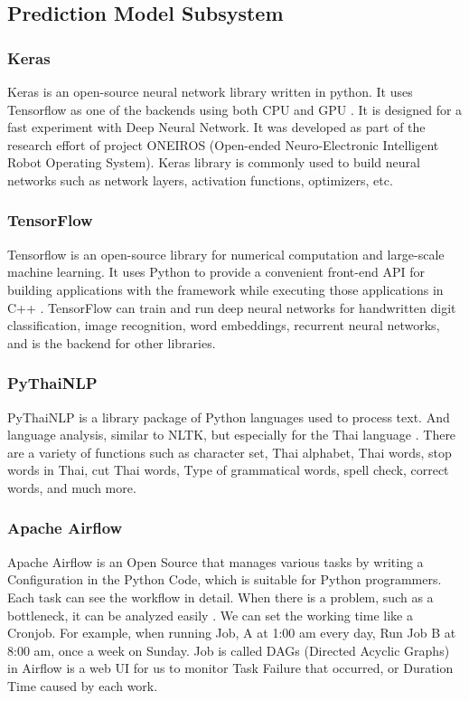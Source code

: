 \documentclass[12pt,oneside,openright,a4paper]{cpe-english-project}
\begin{document}
\subsection{Prediction Model Subsystem}
\subsubsection{Keras}
Keras is an open-source neural network library written in python. It uses Tensorflow as one of the
backends using both CPU and GPU \cite{keras}. It is designed for a fast experiment with Deep Neural
Network. It was developed as part of the research effort of project ONEIROS (Open-ended Neuro-Electronic
Intelligent Robot Operating System). Keras library is commonly used to build neural networks such as network
layers, activation functions, optimizers, etc.

\subsubsection{TensorFlow}
Tensorflow is an open-source library for numerical computation and large-scale machine learning.
It uses Python to provide a convenient front-end API for building applications with the framework
while executing those applications in C++ \cite{what_is_tf}. TensorFlow can train and run deep neural
networks for handwritten digit classification, image recognition, word embeddings, recurrent neural
networks, and is the backend for other libraries.

\subsubsection{PyThaiNLP}
PyThaiNLP is a library package of Python languages used to process text. And language analysis,
similar to NLTK, but especially for the Thai language \cite{pythainlp}.
There are a variety of functions such as character set, Thai alphabet, Thai words,
stop words in Thai, cut Thai words, Type of grammatical words, spell check, correct words,
and much more.

\subsubsection{Apache Airflow}
Apache Airflow is an Open Source that manages various tasks by writing a Configuration in
the Python Code, which is suitable for Python programmers. Each task can see the workflow
in detail. When there is a problem, such as a bottleneck, it can be analyzed easily \cite{apache_airflow}.
We can set the working time like a Cronjob. For example, when running Job, A at 1:00 am
every day, Run Job B at 8:00 am, once a week on Sunday. Job is called DAGs
(Directed Acyclic Graphs) in Airflow is a web UI for us to monitor Task Failure
that occurred, or Duration Time caused by each work.
\end{document}

